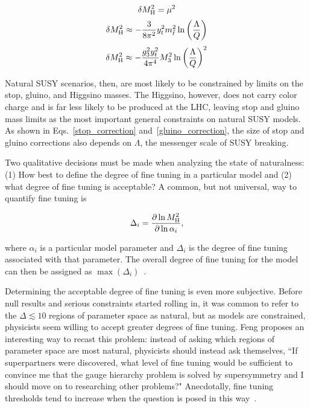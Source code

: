 \documentclass[12pt]{article}
\begin{document}
    \noindent \begin{equation}
        \delta M_{\mathrm{H}}^2 = \mu^2
        \label{higgsino_correction}
    \end{equation}
    \noindent \begin{equation}
        \delta M_{\mathrm{H}}^2 \approx - \frac{3}{8\pi^2} y_t^2 m_{\tilde{t}}^2 \ln{\left(\frac{\Lambda}{Q}\right)}
        \label{stop_correction}
    \end{equation}
    \noindent \begin{equation}
        \delta M_{\mathrm{H}}^2 \approx - \frac{g_3^2 y_t^2}{4\pi^4} M_3^2 \ln{\left(\frac{\Lambda}{Q}\right)}^2
        \label{gluino_correction}
    \end{equation}

    Natural SUSY scenarios, then, are most likely to be constrained by limits on the stop, gluino, and Higgsino masses. The Higgsino, however, does not carry color charge and is far less likely to be produced at the LHC, leaving stop and gluino mass limits as the most important general constraints on natural SUSY models. As shown in Eqs.~\ref{stop_correction} and~\ref{gluino_correction}, the size of stop and gluino corrections also depends on $\Lambda$, the messenger scale of SUSY breaking.

    Two qualitative decisions must be made when analyzing the state of naturalness: (1) How best to define the degree of fine tuning in a particular model and (2) what degree of fine tuning is acceptable? A common, but not universal, way to quantify fine tuning is
    
    \noindent \begin{equation}
        \Delta_i = \frac{\partial \ln{M_{\mathrm{H}}^2}}{\partial \ln{\alpha_i}} ,
        \label{fine_tuning}
    \end{equation}

    \noindent where $\alpha_i$ is a particular model parameter and $\Delta_i$ is the degree of fine tuning associated with that parameter. The overall degree of fine tuning for the model can then be assigned as $\max{\left(\Delta_i\right)}$~\cite{cornering}.

    Determining the acceptable degree of fine tuning is even more subjective. Before null results and serious constraints started rolling in, it was common to refer to the $\Delta \lesssim 10$ regions of parameter space as natural, but as models are constrained, physicists seem willing to accept greater degrees of fine tuning. Feng proposes an interesting way to recast this problem: instead of asking which regions of parameter space are most natural, physicists should instead ask themselves, ``If superpartners were discovered, what level of fine tuning would be sufficient to convince me that the gauge hierarchy problem is solved by supersymmetry and I should move on to researching other problems?" Anecdotally, fine tuning thresholds tend to increase when the question is posed in this way~\cite{feng}.
\end{document}

